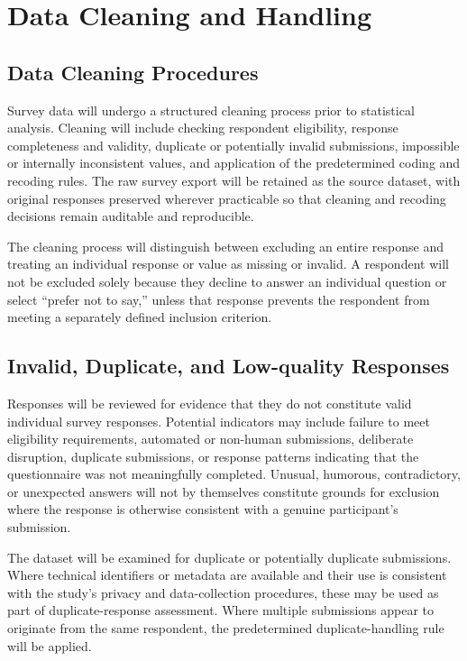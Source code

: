 \section{Data Cleaning and Handling}

\subsection{Data Cleaning Procedures}

Survey data will undergo a structured cleaning process prior to statistical analysis. Cleaning will include checking respondent eligibility, response completeness and validity, duplicate or potentially invalid submissions, impossible or internally inconsistent values, and application of the predetermined coding and recoding rules. The raw survey export will be retained as the source dataset, with original responses preserved wherever practicable so that cleaning and recoding decisions remain auditable and reproducible.

The cleaning process will distinguish between excluding an entire response and treating an individual response or value as missing or invalid. A respondent will not be excluded solely because they decline to answer an individual question or select ``prefer not to say,'' unless that response prevents the respondent from meeting a separately defined inclusion criterion.


\subsection{Invalid, Duplicate, and Low-quality Responses}


Responses will be reviewed for evidence that they do not constitute valid individual survey responses. Potential indicators may include failure to meet eligibility requirements, automated or non-human submissions, deliberate disruption, duplicate submissions, or response patterns indicating that the questionnaire was not meaningfully completed. Unusual, humorous, contradictory, or unexpected answers will not by themselves constitute grounds for exclusion where the response is otherwise consistent with a genuine participant's submission.

The dataset will be examined for duplicate or potentially duplicate submissions. Where technical identifiers or metadata are available and their use is consistent with the study's privacy and data-collection procedures, these may be used as part of duplicate-response assessment. Where multiple submissions appear to originate from the same respondent, the predetermined duplicate-handling rule will be applied.


